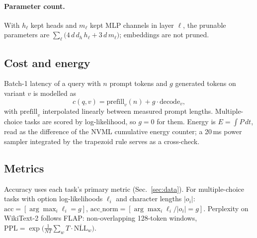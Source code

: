 \documentclass[11pt,a4paper]{article}
\begin{document}
\paragraph{Parameter count.} With $h_\ell$ kept heads and $m_\ell$ kept MLP channels in layer $\ell$,
the prunable parameters are $\sum_\ell\big(4\,d\,d_h\,h_\ell+3\,d\,m_\ell\big)$; embeddings are not pruned.

\subsection{Cost and energy}
Batch-1 latency of a query with $n$ prompt tokens and $g$ generated tokens on variant $v$ is modelled as
\begin{equation}
  c(q,v)=\mathrm{prefill}_v(n)+g\cdot\mathrm{decode}_v ,
\end{equation}
with $\mathrm{prefill}_v$ interpolated linearly between measured prompt lengths. Multiple-choice tasks are
scored by log-likelihood, so $g=0$ for them. Energy is $E=\int P\,dt$, read as the difference of the NVML
cumulative energy counter; a 20\,ms power sampler integrated by the trapezoid rule serves as a cross-check.

\subsection{Metrics}
Accuracy uses each task's primary metric (Sec.~\ref{sec:data}). For multiple-choice tasks with option
log-likelihoods $\ell_i$ and character lengths $|o_i|$: $\mathrm{acc}=[\arg\max_i\ell_i=g]$,
$\mathrm{acc\_norm}=[\arg\max_i\ell_i/|o_i|=g]$. Perplexity on WikiText-2 follows FLAP:
non-overlapping 128-token windows, $\mathrm{PPL}=\exp\big(\frac{1}{NT}\sum_w T\cdot\overline{\mathrm{NLL}}_w\big)$.

\end{document}
